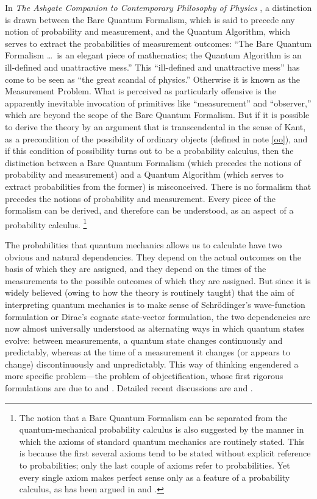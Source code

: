 In \emph{The Ashgate Companion to Contemporary Philosophy of Physics} \citep{Wallace}, a distinction is drawn between the Bare Quantum Formalism, which is said to precede any notion of probability and measurement, and the Quantum Algorithm, which serves to extract the probabilities of measurement outcomes: ``The Bare Quantum Formalism \dots\ is an elegant piece of mathematics; the Quantum Algorithm is an ill-defined and unattractive mess.''  This ``ill-defined and unattractive mess'' has come to be seen as ``the great scandal of physics.'' Otherwise it is known as the Measurement Problem. What is perceived as particularly offensive is the apparently inevitable invocation of primitives like ``measurement'' and ``observer,'' which are beyond the scope of the Bare Quantum Formalism. But if it is possible to derive the theory by an argument that is transcendental in the sense of Kant, as a precondition of the possibility of ordinary objects (defined in note \ref{oo}), and if this condition of possibility turns out to be a probability calculus, then the distinction between a Bare Quantum Formalism (which precedes the notions of probability and measurement) and a Quantum Algorithm (which serves to extract probabilities from the former) is misconceived. There is no formalism that precedes the notions of probability and measurement. Every piece of the formalism can be derived, and therefore can be understood, as an aspect of a probability calculus.%
\footnote{The notion that a Bare Quantum Formalism can be separated from the quantum-mechanical probability calculus is also suggested by the manner in which the axioms of standard quantum mechanics are routinely stated. This is because the first several axioms tend to be stated without explicit reference to probabilities; only the last couple of axioms refer to probabilities. Yet every single axiom makes perfect sense only as a feature of a probability calculus, as has been argued in \citep{Mohrhoff2009b} and \citep[Section 16.1]{Mohrhoff2011}.}

The probabilities that quantum mechanics allows us to calculate have two obvious and natural dependencies. They depend on the actual outcomes on the basis of which they are assigned, and they depend on the times of the measurements to the possible outcomes of which they are assigned. But since it is widely believed (owing to how the theory is routinely taught) that the aim of interpreting quantum mechanics is to make sense of Schr\"odinger's wave-function formulation or Dirac's cognate state-vector formulation, the two dependencies are now almost universally understood as alternating ways in which quantum states evolve: between measurements, a quantum state changes continuously and predictably, whereas at the time of a measurement it changes (or appears to change) discontinuously and unpredictably. This way of thinking engendered a more specific problem---the problem of objectification, whose first rigorous formulations are due to \citet{vonNeumann} and \citet{Pauli1933}. Detailed recent discussions are \citep{Buschetal} and \citep{Mittelstaedt}. 

